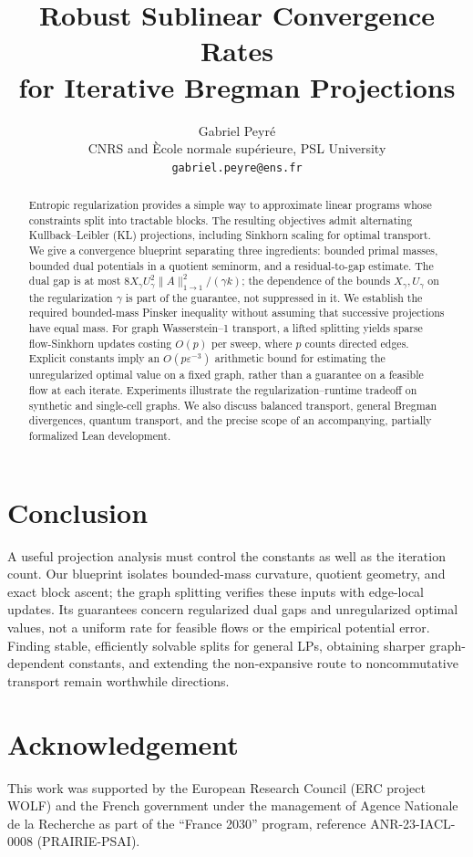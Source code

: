 \documentclass{article}
\title{Robust Sublinear Convergence Rates\\for Iterative Bregman Projections}
\author{Gabriel Peyr\'e\\CNRS and \`Ecole normale sup\'erieure, PSL University\\
\texttt{gabriel.peyre@ens.fr}}
\date{}
\theoremstyle{plain}
\begin{document}
\maketitle
\begin{abstract}
Entropic regularization provides a simple way to approximate linear programs whose constraints split into tractable blocks. The resulting objectives admit alternating Kullback--Leibler (KL) projections, including Sinkhorn scaling for optimal transport. We give a convergence blueprint separating three ingredients: bounded primal masses, bounded dual potentials in a quotient seminorm, and a residual-to-gap estimate. The dual gap is at most $8X_\gamma U_\gamma^2\lVert A\rVert_{1\to1}^2/(\gamma k)$; the dependence of the bounds $X_\gamma,U_\gamma$ on the regularization $\gamma$ is part of the guarantee, not suppressed in it. We establish the required bounded-mass Pinsker inequality without assuming that successive projections have equal mass. For graph Wasserstein--1 transport, a lifted splitting yields sparse flow-Sinkhorn updates costing $O(p)$ per sweep, where $p$ counts directed edges. Explicit constants imply an $O(p\varepsilon^{-3})$ arithmetic bound for estimating the unregularized optimal value on a fixed graph, rather than a guarantee on a feasible flow at each iterate. Experiments illustrate the regularization--runtime tradeoff on synthetic and single-cell graphs. We also discuss balanced transport, general Bregman divergences, quantum transport, and the precise scope of an accompanying, partially formalized Lean development.
\end{abstract}





\section*{Conclusion}
A useful projection analysis must control the constants as well as the iteration count. Our blueprint isolates bounded-mass curvature, quotient geometry, and exact block ascent; the graph splitting verifies these inputs with edge-local updates. Its guarantees concern regularized dual gaps and unregularized optimal values, not a uniform rate for feasible flows or the empirical potential error. Finding stable, efficiently solvable splits for general LPs, obtaining sharper graph-dependent constants, and extending the non-expansive route to noncommutative transport remain worthwhile directions.
\section*{Acknowledgement}
This work was supported by the European Research Council (ERC project WOLF) and the French government under the management of Agence Nationale de la Recherche as part of the ``France 2030'' program, reference ANR-23-IACL-0008 (PRAIRIE-PSAI).
\end{document}

